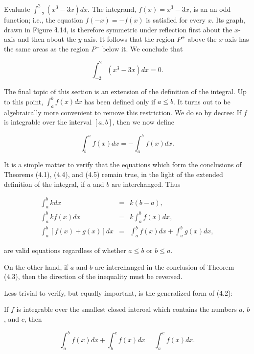
\begin{example}
Evaluate $\int_{-2}^{2} (x^3 - 3x) dx$. The integrand, $f(x) = x^3 - 3x$, is an an odd function; i.e., the equation $f(- x) = - f(x)$ is satisfied for every $x$. Its graph, drawn in Figure \f{4.14}, is therefore symmetric under reflection first about the $x$-axis and then about the $y$-axis. It follows that the region $P^{+}$ above the $x$-axis has the same areas as the region $P^{-}$ below it. 
We conclude that

$$
\int_{-2}^{2} (x^3 - 3x) dx = 0.
$$
\end{example}


The final topic of this section is an extension of the definition of the integral. Up to this point, $\int_{a}^{b} f(x) dx$ has been defined only if $a \leq b$. It turns out to be algebraically more convenient to remove this restriction. We do so by decree: If $f$ is integrable over the interval $[a, b]$, then we now define 

\begin{equation}
\int_{b}^{a} f(x) dx = - \int_{a}^{b} f(x) dx.
\label{eq4.4.4}
\end{equation}

It is a simple matter to verify that the equations which form the conclusions of Theorems (4.1), (4.4), and (4.5) remain true, in the light of the extended definition of the integral, if $a$ and $b$ are interchanged. Thus

\begin{eqnarray*}
                \int_{a}^{b} k dx &=& k(b - a),\\
           \int_{a}^{b} k f(x)dx &=& k\int_{a}^{b} f(x) dx,\\
\int_{a}^{b} [f (x) + g(x)] dx &=& \int_{a}^{b} f (x) dx + \int_{a}^{b} g(x) dx,
\end{eqnarray*}

\noindent are valid equations regardless of whether $a \leq b$ or $b \leq a$.

On the other hand, if $a$ and $b$ are interchanged in the conclusion of Theorem (4.3), then the direction of the inequality must be reversed.

Less trivial to verify, but equally important, is the generalized form of (4.2):


\begin{theorem} %
If $f$ is integrable over the smallest closed interoal which contains the numbers $a$, $b$, and $c$, then

$$
\int_{a}^{b} f(x)dx + \int_{b}^{c} f(x)dx = \int_{a}^{c} f(x)dx.
$$
\end{theorem}


